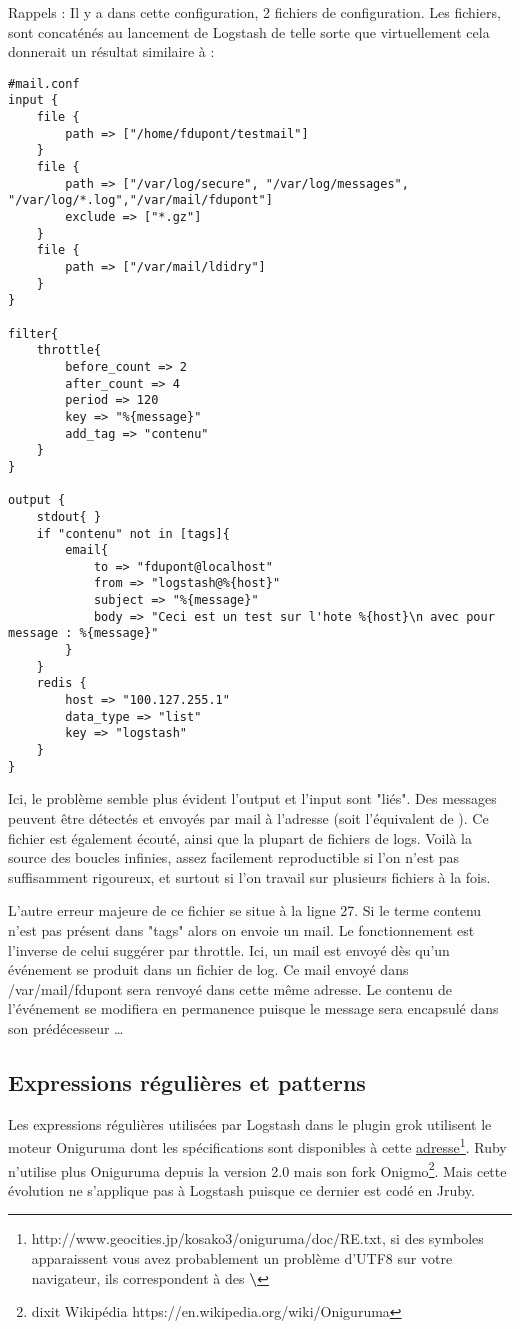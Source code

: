 Rappels : Il y a dans cette configuration, 2 fichiers de configuration. Les fichiers,
sont concaténés au lancement de Logstash de telle sorte que virtuellement cela donnerait 
un résultat similaire à :


\begin{lstlisting}[style=logstash,label={lst:conflogstashiniteloop2},caption={Infinite loop concaténé}]
#mail.conf
input {
    file {
        path => ["/home/fdupont/testmail"]
    }
    file {
        path => ["/var/log/secure", "/var/log/messages", "/var/log/*.log","/var/mail/fdupont"]
        exclude => ["*.gz"]
    }
    file {
        path => ["/var/mail/ldidry"]
    }
}

filter{
    throttle{
        before_count => 2
        after_count => 4
        period => 120
        key => "%{message}"
        add_tag => "contenu"
    }
}

output {
    stdout{ }
    if "contenu" not in [tags]{
        email{
            to => "fdupont@localhost"
            from => "logstash@%{host}"
            subject => "%{message}"
            body => "Ceci est un test sur l'hote %{host}\n avec pour message : %{message}"
        }
    }
    redis {
        host => "100.127.255.1"
        data_type => "list"
        key => "logstash"
    }
}
\end{lstlisting}

Ici, le problème semble plus évident l'output et l'input sont "liés". Des messages
peuvent être détectés et envoyés par mail à l'adresse  (soit
l'équivalent de ). Ce fichier est également écouté, ainsi que la 
plupart de fichiers de logs. Voilà la source des boucles infinies, assez facilement
reproductible si l'on n'est pas suffisamment rigoureux, et surtout si l'on travail 
sur plusieurs fichiers à la fois.

L'autre erreur majeure de ce fichier se situe à la ligne 27. Si le terme contenu 
n'est pas présent dans "tags" alors on envoie un mail. Le fonctionnement est l'inverse 
de celui suggérer par throttle. Ici, un mail est envoyé dès qu'un événement se produit
dans un fichier de log. Ce mail envoyé dans /var/mail/fdupont sera renvoyé dans cette
même adresse. Le contenu de l'événement se modifiera en permanence puisque le message
sera encapsulé dans son prédécesseur \ldots

\subsection{Expressions régulières et patterns}
Les expressions régulières utilisées par Logstash dans le plugin grok utilisent le 
moteur Oniguruma dont les spécifications sont disponibles à cette 
\href{http://www.geocities.jp/kosako3/oniguruma/doc/RE.txt}{adresse}\footnote{http://www.geocities.jp/kosako3/oniguruma/doc/RE.txt, 
si des symboles \textbf{ \textyen} apparaissent vous avez probablement un problème d'UTF8 sur 
votre navigateur, ils correspondent à des \textbf{ \textbackslash}}.
Ruby n'utilise plus Oniguruma depuis la version 2.0 mais son fork Onigmo\footnote{
dixit Wikipédia https://en.wikipedia.org/wiki/Oniguruma}. Mais cette évolution ne
s'applique pas à Logstash puisque ce dernier est codé en Jruby.

